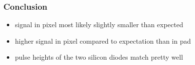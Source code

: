 \begin{frame}
	\frametitle{Conclusion}
	\begin{minipage}[c][4cm]{\textwidth}
		\begin{itemize}
			\itemfill
			\item signal in pixel most likely slightly smaller than expected
			\item higher signal in pixel compared to expectation than in pad
			\item pulse heights of the two silicon diodes match pretty well
		\end{itemize}
	\end{minipage}
\end{frame}
